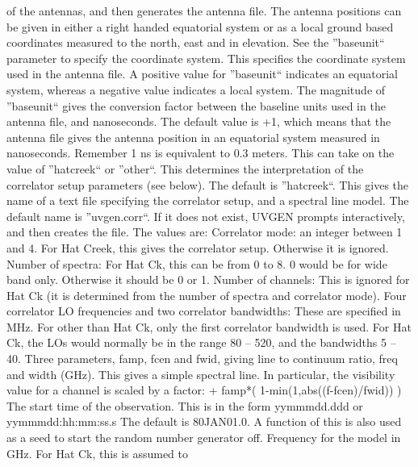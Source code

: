 of the antennas, and then generates the antenna file.
The antenna positions can be given in either a right handed
equatorial system or as a local ground based coordinates measured to the
north, east and in elevation. See the ''baseunit`` parameter to
specify the coordinate system.
This specifies the coordinate system used in the antenna file.
A positive value for ''baseunit`` indicates an equatorial system,
whereas a negative value indicates a local system. The magnitude of
''baseunit`` gives the conversion factor between the baseline units
used in the antenna file, and nanoseconds. The default value is +1,
which means that the antenna file gives the antenna position in an
equatorial system measured in nanoseconds. Remember 1 ns is equivalent
to 0.3 meters.
This can take on the value of ''hatcreek`` or ''other``. This determines
the interpretation of the correlator setup parameters (see below).
The default is ''hatcreek``.
This gives the name of a text file specifying the correlator
setup, and a spectral line model. The default name is ''uvgen.corr``.
If it does not exist, UVGEN prompts interactively, and then creates
the file.
The values are:
{\eightpoint\begintt
Correlator mode:    an integer between 1 and 4. For Hat Creek, this gives the
                    correlator setup. Otherwise it is ignored.
Number of spectra:  For Hat Ck, this can be from 0 to 8. 0 would be for wide
                    band only. Otherwise it should be 0 or 1.
Number of channels: This is ignored for Hat Ck (it is determined from the
                    number of spectra and correlator mode).
Four correlator LO frequencies and two correlator bandwidths: 
                    These are specified in MHz. For other than Hat Ck, only
                    the first correlator bandwidth is used. For Hat Ck, the
                    LOs would normally be in the range 80 -- 520, and the
                    bandwidths 5 -- 40.
\endtt}
Three parameters, famp, fcen and fwid, giving line to continuum
ratio, freq and width (GHz). This gives a simple spectral line.
In particular, the visibility value for a channel is scaled by
a factor:
{\eightpoint{} + famp*( 1-min(1,abs((f-fcen)/fwid)) )
\endtt}
The start time of the observation. This is in the form
{\eightpoint\begintt
  yymmmdd.ddd or yymmmdd:hh:mm:ss.s
\endtt}
The default is 80JAN01.0. A function of this is also used
as a seed to start the random number generator off.
Frequency for the model in GHz. For Hat Ck, this is assumed to
